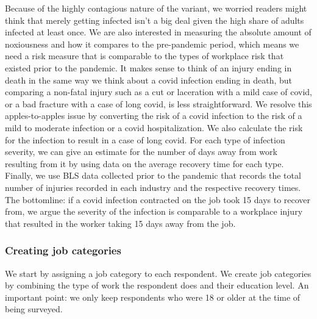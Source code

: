 \documentclass[
]{article}
\begin{document}
Because of the highly contagious nature of the variant, we worried
readers might think that merely getting infected isn't a big deal given
the high share of adults infected at least once. We are also interested
in measuring the absolute amount of noxiousness and how it compares to
the pre-pandemic period, which means we need a risk measure that is
comparable to the types of workplace risk that existed prior to the
pandemic. It makes sense to think of an injury ending in death in the
same way we think about a covid infection ending in death, but comparing
a non-fatal injury such as a cut or laceration with a mild case of
covid, or a bad fracture with a case of long covid, is less
straightforward. We resolve this apples-to-apples issue by converting
the risk of a covid infection to the risk of a mild to moderate
infection or a covid hospitalization. We also calculate the risk for the
infection to result in a case of long covid. For each type of infection
severity, we can give an estimate for the number of days away from work
resulting from it by using data on the average recovery time for each
type. Finally, we use BLS data collected prior to the pandemic that
records the total number of injuries recorded in each industry and the
respective recovery times. The bottomline: if a covid infection
contracted on the job took 15 days to recover from, we argue the
severity of the infection is comparable to a workplace injury that
resulted in the worker taking 15 days away from the job.

\hypertarget{creating-job-categories}{%
\subsubsection{Creating job categories}\label{creating-job-categories}}

We start by assigning a job category to each respondent. We create job
categories by combining the type of work the respondent does and their
education level. An important point: we only keep respondents who were
18 or older at the time of being surveyed.
\end{document}
